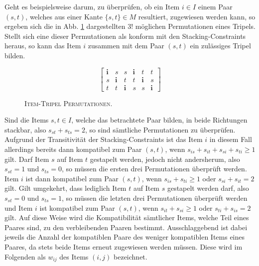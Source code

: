 Geht es beispielsweise darum, zu überprüfen, ob ein Item $i \in I$ einem Paar $(s, t)$, welches aus einer Kante $\{s, t\} \in M$ resultiert,
zugewiesen werden kann, so ergeben sich die in Abb. \ref{fig:triple_permutations} dargestellten $3!$ möglichen Permutationen eines Tripels. Stellt sich eine dieser Permutationen als konform mit den Stacking-Constraints heraus, so kann das Item $i$ zusammen mit dem Paar $(s, t)$ ein zulässiges Tripel bilden.
\begin{figure}[H]
\[
\begin{bmatrix}
  \boldsymbol{i} & s & s & \boldsymbol{i} & t & t \\
  s & \boldsymbol{i} & t & t & \boldsymbol{i} & s \\
  t & t & \boldsymbol{i} & s & s & \boldsymbol{i}
\end{bmatrix}
\]
\caption{\textsc{Item-Tripel Permutationen.}}
\label{fig:triple_permutations}
\end{figure}
Sind die Items $s, t \in I$, welche das betrachtete Paar bilden, in beide Richtungen stackbar, also $s_{st} + s_{ts} = 2$, so sind sämtliche
Permutationen zu überprüfen.
Aufgrund der Transitivität der Stacking-Constraints ist das Item $i$ in diesem Fall allerdings bereits dann kompatibel zum Paar $(s, t)$,
wenn $s_{is} + s_{it} + s_{si} + s_{ti} \geq 1$ gilt.
Darf Item $s$ auf Item $t$ gestapelt werden, jedoch nicht andersherum, also $s_{st} = 1$ und $s_{ts} = 0$,
so müssen die ersten drei Permutationen überprüft werden. Item $i$ ist dann kompatibel zum Paar $(s, t)$,
wenn $s_{is} + s_{ti} \geq 1$ oder $s_{si} + s_{it} = 2$ gilt.
Gilt umgekehrt, dass lediglich Item $t$ auf Item $s$ gestapelt werden darf, also $s_{st} = 0$ und $s_{ts} = 1$, so
müssen die letzten drei Permutationen überprüft werden und Item $i$ ist kompatibel zum Paar $(s, t)$,
wenn $s_{it} + s_{si} \geq 1$ oder $s_{ti} + s_{is} = 2$ gilt.\newline
Auf diese Weise wird die Kompatibilität sämtlicher Items, welche Teil eines Paares sind, zu den verbleibenden Paaren bestimmt.
Ausschlaggebend ist dabei jeweils die Anzahl der kompatiblen Paare des weniger kompatiblen Items eines Paares,
da stets beide Items erneut zugewiesen werden müssen. Diese wird im Folgenden als 
$w_{ij}$ des Items $(i, j)$ bezeichnet.

